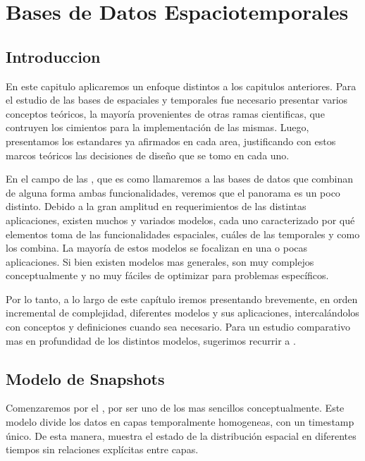 \chapter{Bases de Datos Espaciotemporales}  \label{cap:et}

\section{Introduccion} \label{sec:st:intro}

En este capitulo aplicaremos un enfoque distintos a los capitulos anteriores.
Para el estudio de las bases de espaciales y temporales fue necesario presentar varios conceptos teóricos,
la mayoría provenientes de otras ramas cientificas,
que contruyen los cimientos para la implementación de las mismas.
Luego, presentamos los estandares ya afirmados en cada area,
justificando con estos marcos teóricos las decisiones de diseño que se tomo en cada uno.

En el campo de las ,
que es como llamaremos a las bases de datos que combinan de alguna forma ambas funcionalidades,
veremos que el panorama es un poco distinto.
Debido a la gran amplitud en requerimientos de las distintas aplicaciones,
existen muchos y variados modelos, cada uno caracterizado por
qué elementos toma de las funcionalidades espaciales, cuáles de las temporales y como los combina.
La mayoría de estos modelos se focalizan en una o pocas aplicaciones.
Si bien existen modelos mas generales, son muy complejos conceptualmente
y no muy fáciles de optimizar para problemas específicos.

Por lo tanto, a lo largo de este capítulo iremos presentando brevemente, en orden incremental de complejidad,
diferentes modelos y sus aplicaciones, intercalándolos con conceptos y definiciones cuando sea necesario.
Para un estudio comparativo mas en profundidad de los distintos modelos, sugerimos recurrir a \cite{sp:litreview}.

\section{Modelo de Snapshots}

Comenzaremos por el \textsuperscript{\cite{sp:snapshot}}, por ser uno de los mas sencillos conceptualmente.
Este modelo divide los datos en capas temporalmente homogeneas, con un timestamp único.
De esta manera, muestra el estado de la distribución espacial en diferentes tiempos sin relaciones explícitas entre capas.

